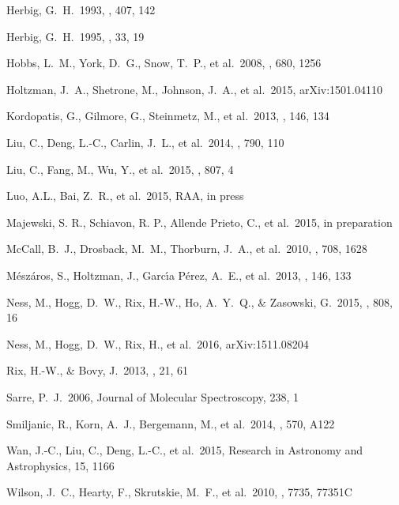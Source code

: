 \documentclass[12pt, letterpaper, preprint]{aastex}
\begin{document}
\begin{thebibliography}{24}
 Herbig, G.~H.\ 1993, \apj, 407, 142 

 Herbig, G.~H.\ 1995, \araa, 33, 19 

 Hobbs, L.~M., York, 
D.~G., Snow, T.~P., et al.\ 2008, \apj, 680, 1256 

 Holtzman, J.~A., 
Shetrone, M., Johnson, J.~A., et al.\ 2015, arXiv:1501.04110 

 Kordopatis, G., 
Gilmore, G., Steinmetz, M., et al.\ 2013, \aj, 146, 134 

 Liu, C., Deng, L.-C., 
Carlin, J.~L., et al.\ 2014, \apj, 790, 110 

 Liu, C., Fang, M., Wu, Y., 
et al.\ 2015, \apj, 807, 4 

 Luo, A.L., Bai, Z.~R., et al.\ 2015, RAA, in press

 Majewski, S. R., Schiavon, R. P., Allende Prieto, C., et al.\ 2015, in preparation

 McCall, B.~J., Drosback, 
M.~M., Thorburn, J.~A., et al.\ 2010, \apj, 708, 1628 

M{\'e}sz{\'a}ros, S., Holtzman, J., Garc{\'{\i}}a P{\'e}rez, A.~E., et al.\ 
2013, \aj, 146, 133 

 Ness, M., Hogg, D.~W., 
Rix, H.-W., Ho, A.~Y.~Q., \& Zasowski, G.\ 2015, \apj, 808, 16 

 Ness, M., Hogg, D.~W., 
Rix, H., et al.\ 2016, arXiv:1511.08204 

 Rix, H.-W., \& Bovy, J.\ 2013, \aapr, 21, 61 

 Sarre, P.~J.\ 2006, Journal of 
Molecular Spectroscopy, 238, 1 

 Smiljanic, R., Korn, A.~J., Bergemann, M., et al.\ 2014, \aap, 570, A122 

 Wan, J.-C., Liu, C., Deng, 
L.-C., et al.\ 2015, Research in Astronomy and Astrophysics, 15, 1166 

 Wilson, J.~C., Hearty, 
F., Skrutskie, M.~F., et al.\ 2010, \procspie, 7735, 77351C 


\end{thebibliography}
\end{document}

